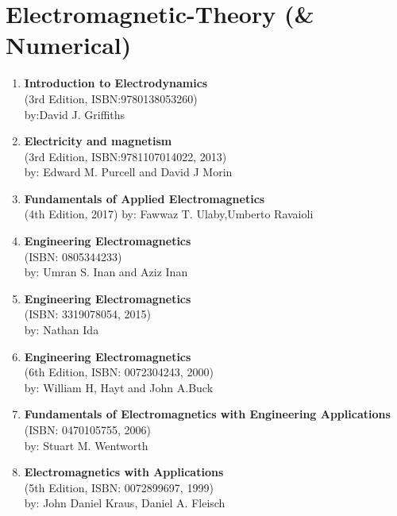 \documentclass{article}
\begin{document}
\newpage
\section{Electromagnetic-Theory (\& Numerical)}
%
\begin{enumerate}
\item \textbf{Introduction to Electrodynamics}\\
(3rd Edition, ISBN:9780138053260)\\
by:David J. Griffiths
%
\item \textbf{Electricity and magnetism}\\
(3rd Edition, ISBN:9781107014022, 2013)\\
by: Edward M. Purcell and David J Morin
%
\item \textbf{Fundamentals of Applied Electromagnetics}\\
(4th Edition, 2017)
by: Fawwaz T. Ulaby,Umberto Ravaioli
%
\item \textbf{Engineering Electromagnetics}\\
(ISBN: 0805344233)\\
by: Umran S. Inan and Aziz Inan
%
\item \textbf{Engineering Electromagnetics}\\
(ISBN: 3319078054, 2015)\\
by: Nathan Ida
%
\item \textbf{Engineering Electromagnetics}\\
(6th Edition, ISBN: 0072304243, 2000)\\
by: William H, Hayt and John A.Buck
%
\item \textbf{Fundamentals of Electromagnetics with Engineering Applications}\\
(ISBN: 0470105755, 2006)\\
by: Stuart M. Wentworth
%
\item \textbf{Electromagnetics with Applications}\\
(5th Edition, ISBN: 0072899697, 1999)\\
by: John Daniel Kraus, Daniel A. Fleisch
\end{enumerate}
\end{document}
